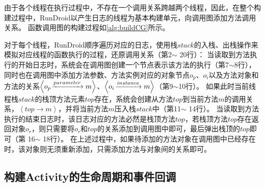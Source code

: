 
由于各个线程在执行过程中，不存在一个调用关系跨越两个线程，因此，在整个构建过程中，RunDroid以产生日志的线程为基本构建单元，向调用图添加方法调用关系。
函数调用图的构建过程如\autoref{alg:buildCG}所示。

对于每个线程，RunDroid顺序遍历对应的日志，使用栈$stack$的入栈、出栈操作来模拟对应线程的函数执行的过程，还原调用关系（第2$\sim$ 20行）：
当读取到方法执行的开始日志时，系统会在调用图创建一个节点表示该方法的执行（第7$\sim$8行），
同时也在调用图中添加方法参数、方法实例对应的对象节点$o_p$、$o_i$以及方法对象和方法的关系$ \left\langle  o_p \joinrel\xrightarrow{parameter}   m \right\rangle   $、$ \left\langle   o_i \joinrel\xrightarrow{instance}   m \right\rangle  $（第9$\sim$10行）。
如果此时当前线程栈$stack$的栈顶方法元素$top$存在，系统会创建从方法$top$到当前方法$m$的调用关系，$\left\langle top \to m \right \rangle  $，并将当前方法$m$压入栈$stack$中（第11$\sim$ 14行）。
当读取到方法执行的结束日志时，该日志对应的方法必然是栈顶方法$top$，若栈顶方法$top$存在返回对象$o_r$，则只需要将$o_r$和$top$的关系添加到调用图中即可，最后弹出栈顶的$top$即可（第 16$\sim$ 18行）。
在上述过程中，如果待添加的方法对象在调用图中已经存在时，该对象则无须重新添加，只需添加方法与对象间的关系即可。








\subsection{构建Activity的生命周期和事件回调}

